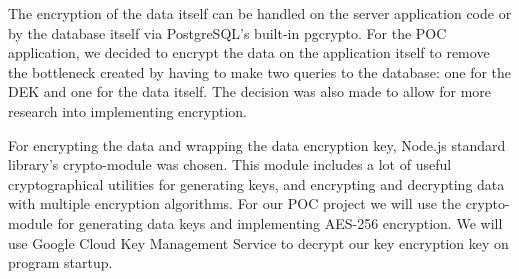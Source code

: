 The encryption of the data itself can be handled on the server application code or by the database itself via PostgreSQL's built-in pgcrypto.
For the POC application, we decided to encrypt the data on the application itself to remove the bottleneck created by having to make two queries to the database: one for the DEK and one for the data itself.
The decision was also made to allow for more research into implementing encryption.

For encrypting the data and wrapping the data encryption key, Node.js standard library's crypto-module was chosen.
This module includes a lot of useful cryptographical utilities for generating keys, and encrypting and decrypting data with multiple encryption algorithms.
\cite{nodejs}
For our POC project we will use the crypto-module for generating data keys and implementing AES-256 encryption.
We will use Google Cloud Key Management Service to decrypt our key encryption key on program startup.
